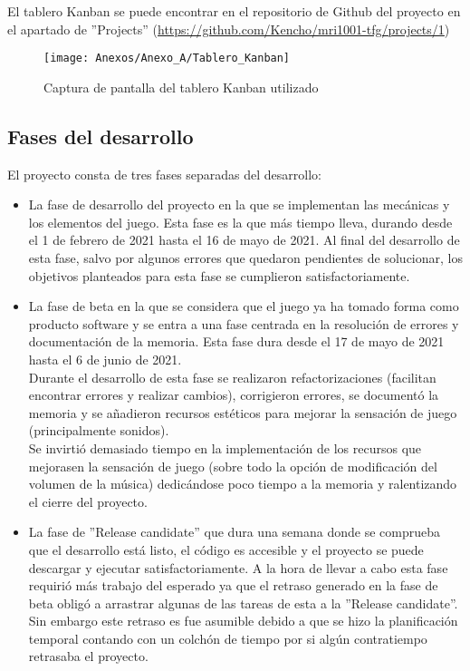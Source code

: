 El tablero Kanban se puede encontrar en el repositorio de Github del proyecto en el apartado de ''Projects'' (\url{https://github.com/Kencho/mri1001-tfg/projects/1})

\begin{figure}[h]
\centering
\texttt{[image: Anexos/Anexo\_A/Tablero\_Kanban]}
\caption{Captura de pantalla del tablero Kanban utilizado}
\end{figure}
\clearpage

\subsection{Fases del desarrollo}
El proyecto consta de tres fases separadas del desarrollo:
\begin{itemize}
\item
La fase de desarrollo del proyecto en la que se implementan las mecánicas y los elementos del juego. Esta fase es la que más tiempo lleva, durando desde el 1 de febrero de 2021 hasta el 16 de mayo de 2021. Al final del desarrollo de esta fase, salvo por algunos errores que quedaron pendientes de solucionar, los objetivos planteados para esta fase se cumplieron satisfactoriamente.
\item
La fase de beta en la que se considera que el juego ya ha tomado forma como producto software y se entra a una fase centrada en la resolución de errores y documentación de la memoria. Esta fase dura desde el 17 de mayo de 2021 hasta el 6 de junio de 2021.\\
Durante el desarrollo de esta fase se realizaron refactorizaciones (facilitan encontrar errores y realizar cambios), corrigieron errores, se documentó la memoria y se añadieron recursos estéticos para mejorar la sensación de juego (principalmente sonidos).\\
Se invirtió demasiado tiempo en la implementación de los recursos que mejorasen la sensación de juego (sobre todo la opción de modificación del volumen de la música) dedicándose poco tiempo a la memoria y ralentizando el cierre del proyecto.
\item
La fase de ''Release candidate'' que dura una semana donde se comprueba que el desarrollo está listo, el código es accesible y el proyecto se puede descargar y ejecutar satisfactoriamente. A la hora de llevar a cabo esta fase requirió más trabajo del esperado ya que el retraso generado en la fase de beta obligó a arrastrar algunas de las tareas de esta a la ''Release candidate''. Sin embargo este retraso es fue asumible debido a que se hizo la planificación temporal contando con un colchón de tiempo por si algún contratiempo retrasaba el proyecto.
\end{itemize}

